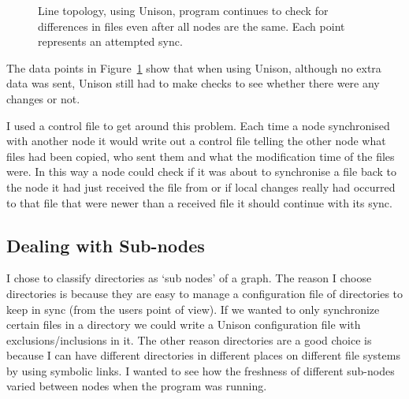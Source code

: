 \documentclass[12pt]{article}
\begin{document}
\begin{figure}[htp]
    \caption{Line topology, using Unison, program continues to check
    for differences in files even after all nodes are the same.
    Each point represents an attempted sync.}
    \label{fig:line_uni_tail_graph}
\end{figure}

The data points in Figure~\ref{fig:line_uni_tail_graph} show that when using
Unison, although no extra data was sent, Unison still had to make checks to see
whether there were any changes or not.

I used a control file to get around this problem. Each time a node
synchronised with another node it would write out a control file telling
the other node what files had been copied, who sent them and what the
modification time of the files were. In this way a node could check
if it was about to synchronise a file back to the node it had just received
the file from or if local changes really had occurred to that file
that were newer than a received file it should continue with its sync.

\subsection{Dealing with Sub-nodes}
\label{sec:subnodes}
I chose to classify directories as `sub nodes' of a graph. The reason I choose
directories is because they are easy to manage a configuration file of directories to
keep in sync (from the users point of view). If we wanted to only synchronize
certain files in a directory we could write a Unison configuration file with 
exclusions/inclusions in it. The other reason directories are a good choice
is because I can have different directories in different places on different
file systems by using symbolic links. I wanted to see how the freshness of different
sub-nodes varied between nodes when the program was running.
\end{document}
